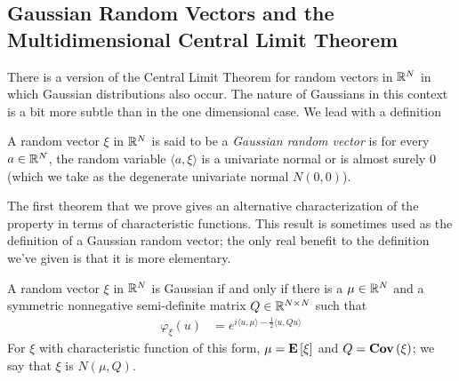 \subsection{Gaussian Random Vectors and the Multidimensional Central
  Limit Theorem}
There is a version of the Central Limit Theorem for random vectors in
$\mathbb{R}^N$ in which Gaussian distributions also occur.  The nature of
Gaussians in this context is a bit more subtle than in the one
dimensional case.  We lead with a definition
\begin{defn}A random vector $\xi$ in $\mathbb{R}^N$ is said to be a \emph{Gaussian random
  vector} is for every $a \in \mathbb{R}^N$, the random variable $\langle
  a,\xi \rangle$ is a univariate normal or is almost surely 0 (which
  we take as the degenerate univariate normal $N(0,0)$).
\end{defn}
The first theorem that we prove gives an alternative characterization
of the property in terms of characteristic functions.  This result is
sometimes used as the definition of a Gaussian random vector; the only
real benefit to the definition we've given is that it is more
elementary.
\begin{thm}\label{GaussianVectorCharacteristicFunction}A random vector
  $\xi$ in $\mathbb{R}^N$ is Gaussian if and only if there is a $\mu \in
  \mathbb{R}^N$ and a symmetric nonnegative semi-definite matrix $Q \in
  \mathbb{R}^{N\times N}$ such that 
\begin{align*}
\varphi_\xi(u) &= e^{i\langle u, \mu\rangle - \frac{1}{2}\langle u, Qu
\rangle}
\end{align*}
For $\xi$ with characteristic function of this form, $\mu =
\textbf{E}\left[\xi\right]$ and $Q = \textbf{Cov} \left (\xi \right )$; we say that $\xi$ is
$N(\mu, Q)$.
\end{thm}
